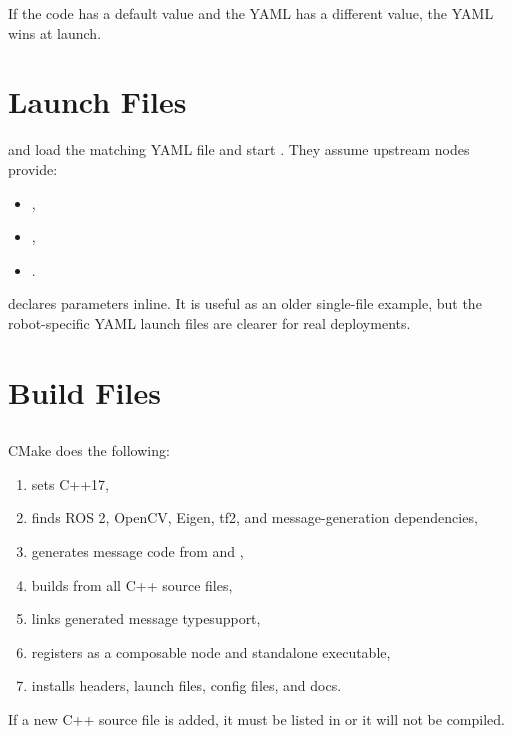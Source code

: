 If the code has a default value and the YAML has a different value, the YAML
wins at launch.

\section{Launch Files}

 and 
load the matching YAML file and start . They assume
upstream nodes provide:

\begin{itemize}
  \item {},
  \item {},
  \item {}.
\end{itemize}

 declares parameters inline. It is useful as an older
single-file example, but the robot-specific YAML launch files are clearer for
real deployments.

\section{Build Files}

\subsection{}

CMake does the following:

\begin{enumerate}
  \item sets C++17,
  \item finds ROS 2, OpenCV, Eigen, tf2, and message-generation dependencies,
  \item generates message code from  and
  ,
  \item builds  from all C++ source files,
  \item links generated message typesupport,
  \item registers  as a composable node and
  standalone executable,
  \item installs headers, launch files, config files, and docs.
\end{enumerate}

If a new C++ source file is added, it must be listed in
 or it will not be compiled.

